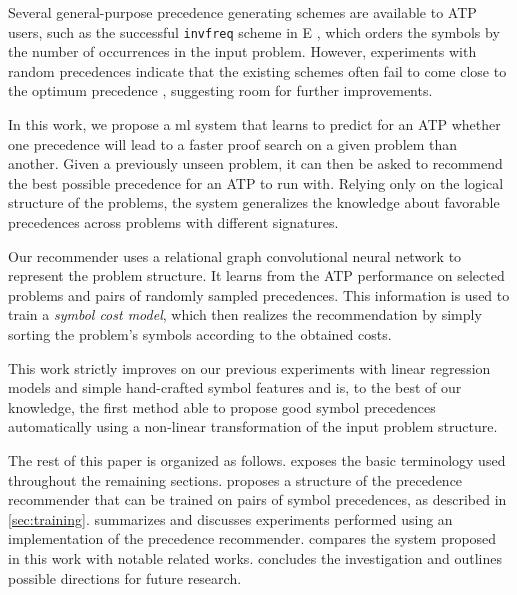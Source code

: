 
Several general-purpose precedence generating schemes are available to ATP users,
such as the successful \texttt{invfreq} scheme in E \cite{E-manual}, which orders the symbols 
by the number of occurrences in the input problem. However, experiments with random precedences
indicate that the existing schemes often fail to come close to the optimum precedence \cite{RegerSuda2017},
suggesting room for further improvements.

In this work, we propose a \acrlong{ml} system that learns to predict for an ATP
whether one precedence will lead to a faster proof search on a given problem than another.
Given a previously unseen problem, it can then be asked to recommend the best possible precedence for an ATP to run with.
Relying only on the logical structure of the problems, %
the system generalizes the knowledge about favorable precedences across problems with different signatures.

Our recommender uses a relational graph convolutional neural network \cite{Schlichtkrull2017}
to represent the problem structure. It learns from the ATP performance on selected problems
and pairs of randomly sampled precedences. This information is used to train
a \emph{symbol cost model}, which then realizes the recommendation by simply sorting 
the problem's symbols according to the obtained costs. 

This work strictly improves on our previous experiments with linear regression models and simple hand-crafted symbol features \cite{DBLP:conf/cade/Bartek020}
and is, to the best of our knowledge, the first method able to propose good symbol precedences automatically 
using a non-linear transformation of the input problem structure.

The rest of this paper is organized as follows.
 exposes the basic terminology used throughout the remaining sections.
 proposes a structure of the precedence recommender that can be trained on pairs of symbol precedences,
as described in \cref{sec:training}.
 summarizes and discusses experiments performed
using an implementation of the precedence recommender.
 compares the system proposed in this work with notable related works.
 concludes the investigation and outlines possible directions for future research.

